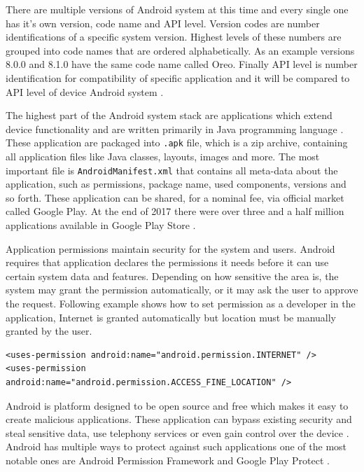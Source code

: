 There are multiple versions of Android system at this time and every single one has it's own version, code name and API level. Version codes are number identifications of a specific system version. Highest levels of these numbers are grouped into code names that are ordered alphabetically. As an example versions 8.0.0 and 8.1.0 have the same code name called Oreo. Finally API level is number identification for compatibility of specific application and it will be compared to API level of device Android system \cite{AOSP, AD}.

The highest part of the Android system stack are applications which extend device functionality and are written primarily in Java programming language \cite{SoASTaD}. These application are packaged into \verb|.apk| file, which is a zip archive, containing all application files like Java classes, layouts, images and more. The most important file is \verb|AndroidManifest.xml| that contains all meta-data about the application, such as permissions, package name, used components, versions and so forth. These application can be shared, for a nominal fee, via official market called Google Play. At the end of 2017 there were over three and a half million applications available in Google Play Store \cite{SoASTaD, NoAAiGPS, NoAA}.

Application permissions maintain security for the system and users. Android requires that application declares the permissions it needs before it can use certain system data and features. Depending on how sensitive the area is, the system may grant the permission automatically, or it may ask the user to approve the request. Following example shows how to set permission as a developer in the application, Internet is granted automatically but location must be manually granted by the user.

\begin{lstlisting}[caption=Application permission settings]
<uses-permission android:name="android.permission.INTERNET" />
<uses-permission android:name="android.permission.ACCESS_FINE_LOCATION" />
\end{lstlisting}

Android is platform designed to be open source and free which makes it easy to create malicious applications. These application can bypass existing security and steal sensitive data, use telephony services or even gain control over the device \cite{ASIMPD}. Android has multiple ways to protect against such applications one of the most notable ones are Android Permission Framework and Google Play Protect \cite{SoASTaD}.

